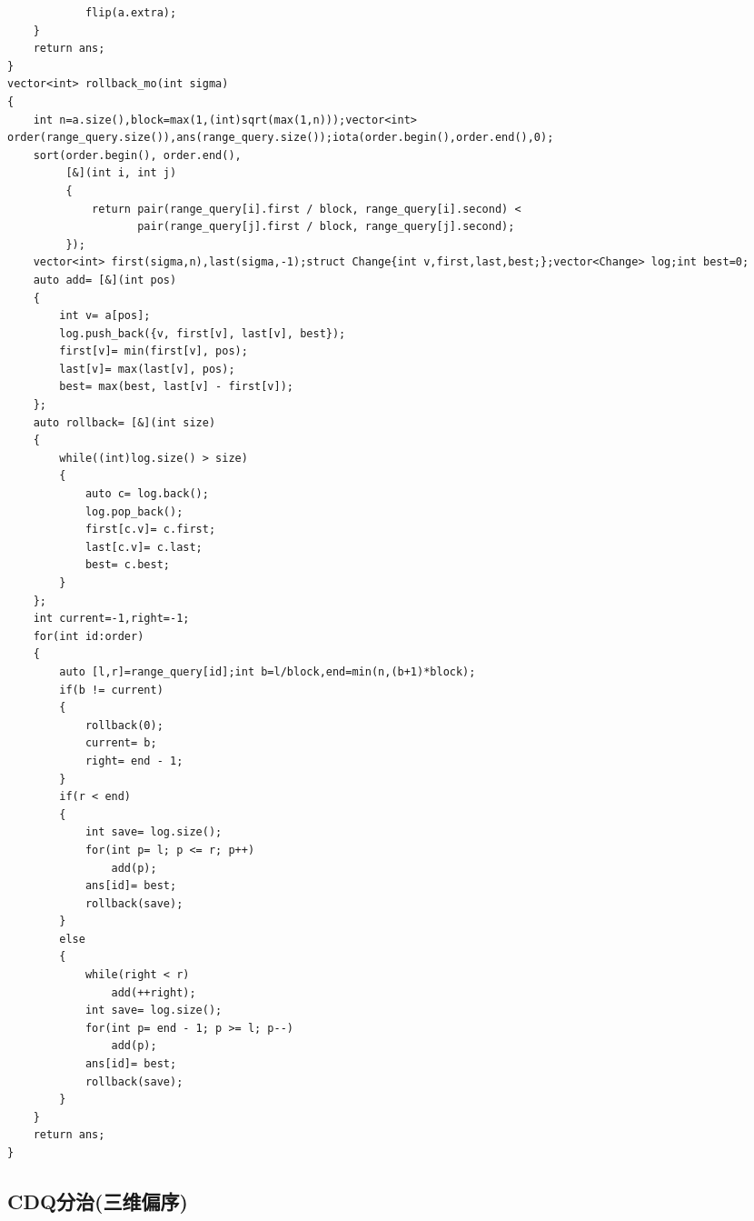 \documentclass[UTF8,fontset=fandol,a4paper,twoside]{ctexart}
\begin{document}
\begin{multicols}{2}
\begin{lstlisting}
            flip(a.extra);
    }
    return ans;
}
vector<int> rollback_mo(int sigma)
{
    int n=a.size(),block=max(1,(int)sqrt(max(1,n)));vector<int> order(range_query.size()),ans(range_query.size());iota(order.begin(),order.end(),0);
    sort(order.begin(), order.end(),
         [&](int i, int j)
         {
             return pair(range_query[i].first / block, range_query[i].second) <
                    pair(range_query[j].first / block, range_query[j].second);
         });
    vector<int> first(sigma,n),last(sigma,-1);struct Change{int v,first,last,best;};vector<Change> log;int best=0;
    auto add= [&](int pos)
    {
        int v= a[pos];
        log.push_back({v, first[v], last[v], best});
        first[v]= min(first[v], pos);
        last[v]= max(last[v], pos);
        best= max(best, last[v] - first[v]);
    };
    auto rollback= [&](int size)
    {
        while((int)log.size() > size)
        {
            auto c= log.back();
            log.pop_back();
            first[c.v]= c.first;
            last[c.v]= c.last;
            best= c.best;
        }
    };
    int current=-1,right=-1;
    for(int id:order)
    {
        auto [l,r]=range_query[id];int b=l/block,end=min(n,(b+1)*block);
        if(b != current)
        {
            rollback(0);
            current= b;
            right= end - 1;
        }
        if(r < end)
        {
            int save= log.size();
            for(int p= l; p <= r; p++)
                add(p);
            ans[id]= best;
            rollback(save);
        }
        else
        {
            while(right < r)
                add(++right);
            int save= log.size();
            for(int p= end - 1; p >= l; p--)
                add(p);
            ans[id]= best;
            rollback(save);
        }
    }
    return ans;
}
\end{lstlisting}
\subsection{CDQ分治(三维偏序)}


\end{multicols}
\end{document}
